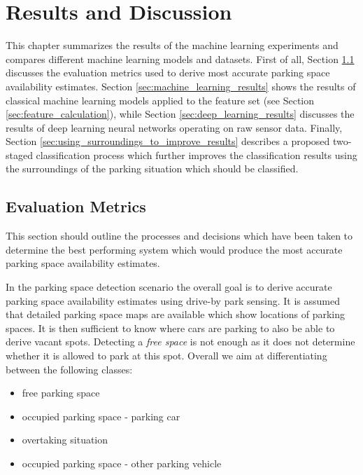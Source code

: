 \chapter{Results and Discussion}
\label{chap:evaluation}

This chapter summarizes the results of the machine learning experiments and compares different machine learning models and datasets. First of all, Section \ref{sec:optimization_goal} discusses the evaluation metrics used to derive most accurate parking space availability estimates. Section \ref{sec:machine_learning_results} shows the results of classical machine learning models applied to the feature set (see Section \ref{sec:feature_calculation}), while Section \ref{sec:deep_learning_results} discusses the results of deep learning neural networks operating on raw sensor data. Finally, Section \ref{sec:using_surroundings_to_improve_results} describes a proposed two-staged classification process which further improves the classification results using the surroundings of the parking situation which should be classified.






\section{Evaluation Metrics}
\label{sec:optimization_goal}

This section should outline the processes and decisions which have been taken to determine the best performing system which would produce the most accurate parking space availability estimates.

In the parking space detection scenario the overall goal is to derive accurate parking space availability estimates using drive-by park sensing. It is assumed that detailed parking space maps are available which show locations of parking spaces. It is then sufficient to know where cars are parking to also be able to derive vacant spots. Detecting a \emph{free space} is not enough as it does not determine whether it is allowed to park at this spot. Overall we aim at differentiating between the following classes:

\begin{itemize}
\setlength{\itemsep}{1pt}
\setlength{\parskip}{0pt}
\setlength{\parsep}{0pt}

\item free parking space
\item occupied parking space - parking car
\item overtaking situation
\item occupied parking space - other parking vehicle

\end{itemize}

